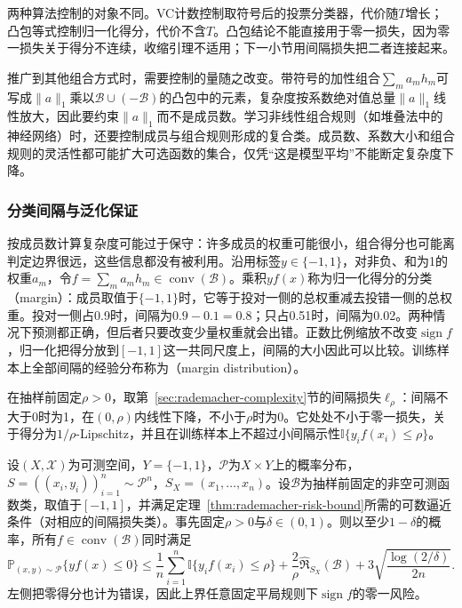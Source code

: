 两种算法控制的对象不同。VC计数控制取符号后的投票分类器，代价随$T$增长；凸包等式控制归一化得分，代价不含$T$。凸包结论不能直接用于零一损失，因为零一损失关于得分不连续，收缩引理不适用；下一小节用间隔损失把二者连接起来。

推广到其他组合方式时，需要控制的量随之改变。带符号的加性组合$\sum_ma_mh_m$可写成$\|a\|_1$乘以$\mathcal B\cup(-\mathcal B)$的凸包中的元素，复杂度按系数绝对值总量$\|a\|_1$线性放大，因此要约束$\|a\|_1$而不是成员数。学习非线性组合规则（如堆叠法中的神经网络）时，还要控制成员与组合规则形成的复合类。成员数、系数大小和组合规则的灵活性都可能扩大可选函数的集合，仅凭“这是模型平均”不能断定复杂度下降。

\subsubsection{分类间隔与泛化保证}

按成员数计算复杂度可能过于保守：许多成员的权重可能很小，组合得分也可能离判定边界很远，这些信息都没有被利用。沿用标签$y\in\{-1,1\}$，对非负、和为1的权重$a_m$，令$f=\sum_ma_mh_m\in\operatorname{conv}(\mathcal B)$。乘积$yf(x)$称为归一化得分的分类（margin）：成员取值于$\{-1,1\}$时，它等于投对一侧的总权重减去投错一侧的总权重。投对一侧占0.9时，间隔为$0.9-0.1=0.8$；只占0.51时，间隔为0.02。两种情况下预测都正确，但后者只要改变少量权重就会出错。正数比例缩放不改变$\operatorname{sign}f$，归一化把得分放到$[-1,1]$这一共同尺度上，间隔的大小因此可以比较。训练样本上全部间隔的经验分布称为（margin distribution）。

在抽样前固定$\rho>0$，取第~\ref{sec:rademacher-complexity}节的间隔损失$\ell_\rho$：间隔不大于0时为1，在$(0,\rho)$内线性下降，不小于$\rho$时为0。它处处不小于零一损失，关于得分为$1/\rho$-Lipschitz，并且在训练样本上不超过小间隔示性$\mathbb I\{y_if(x_i)\leq\rho\}$。

\begin{theorem}[集成的间隔风险界]
\label{thm:ensemble-margin-risk}
\label{thm:learning-ensemble-convex-hull}
设$(X,\mathcal X)$为可测空间，$Y=\{-1,1\}$，$\mathcal P$为$X\times Y$上的概率分布，$S=((x_i,y_i))_{i=1}^n\sim\mathcal P^n$，$S_X=(x_1,\ldots,x_n)$。设$\mathcal B$为抽样前固定的非空可测函数类，取值于$[-1,1]$，并满足定理~\ref{thm:rademacher-risk-bound}所需的可数逼近条件（对相应的间隔损失类）。事先固定$\rho>0$与$\delta\in(0,1)$。则以至少$1-\delta$的概率，所有$f\in\operatorname{conv}(\mathcal B)$同时满足
\begin{equation}
 \mathbb P_{(x,y)\sim\mathcal P}\{yf(x)\leq0\}
 \leq\frac1n\sum_{i=1}^n\mathbb I\{y_if(x_i)\leq\rho\}
 +\frac{2}{\rho}\widehat{\mathfrak R}_{S_X}(\mathcal B)
 +3\sqrt{\frac{\log(2/\delta)}{2n}}.
 \label{eq:ensemble-margin-bound}
\end{equation}
左侧把零得分也计为错误，因此上界任意固定平局规则下$\operatorname{sign}f$的零一风险。
\end{theorem}


